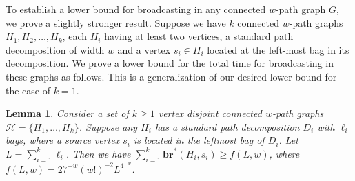 \documentclass[letterpaper,11pt]{article}
\newtheorem{lemma}[theorem]{Lemma}
\newcommand{\bropt}{{\boldsymbol{br}^*}}
\newcommand{\bigell}{L}
\newcommand{\pwidth}{w}
\begin{document}
To establish a lower bound for broadcasting in any connected $\pwidth$-path graph $G$, we prove a slightly stronger result. Suppose we have $k$ connected $\pwidth$-path graphs $H_1, H_2,\ldots, H_k$, each $H_i$ having at least two vertices, a standard path decomposition of width  $\pwidth$ and a vertex $s_i \in H_i$ located at the left-most bag in its decomposition. We prove a lower bound for the total time for broadcasting in these graphs as follows. This is a generalization of our desired lower bound for the case of $k=1$.


\begin{lemma} \label{lemma:brlbsonleft}
    Consider a set of $k\geq 1$ vertex disjoint connected $\pwidth$-path graphs $\mathcal{H} = \{H_1, \ldots, H_k\}$. Suppose any $H_i$ has a standard path decomposition $D_i$ with $\ell_i$ bags, where a source vertex $s_i$ is located in the leftmost bag of $D_i$. Let $\bigell = \sum_{i=1}^k \ell_i$. 
    Then we have
    $\sum_{i=1}^k \bropt(H_i, s_i) \geq f(\bigell, \pwidth)$, where $f(\bigell, \pwidth) = 27^{-\pwidth}(\pwidth!)^{-2}\bigell^{4^{-\pwidth}}$.
\end{lemma}
\end{document}

